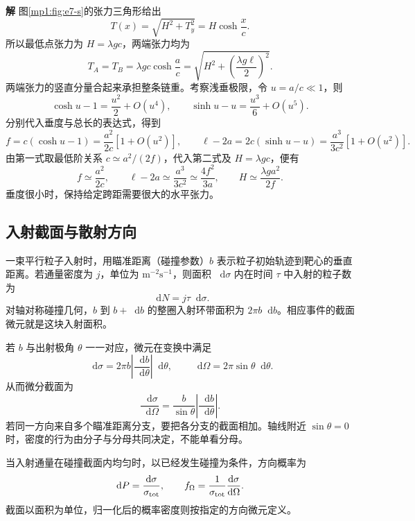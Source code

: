 \documentclass[11pt,openany,fontset=fandol]{ctexbook}
\theoremstyle{definition}\newtheorem{example}{例}[chapter]\newtheorem{exercise}{习题}[chapter]
\newcommand{\SolutionStart}{\par\medskip\ifdim\pagetotal>0pt\ifdim\dimexpr\pagegoal-\pagetotal\relax<3\baselineskip\newpage\fi\fi\noindent\textbf{解}\quad\ignorespaces}
\newenvironment{solution}{\SolutionStart}{\par\medskip}
\newcommand{\dd}{\mathop{}\!\mathrm d}\newcommand{\ee}{\mathrm e}\newcommand{\vct}[1]{\bm{#1}}
\begin{document}
\begin{solution}
图\ref{mp1:fig:e7-s}的张力三角形给出
\[
T(x)=\sqrt{H^2+T_y^2}=H\cosh\frac xc.
\]
所以最低点张力为 $H=\lambda gc$，两端张力均为
\[
T_A=T_B=\lambda gc\cosh\frac ac
=\sqrt{H^2+\left(\frac{\lambda g\ell}{2}\right)^2}.
\]
两端张力的竖直分量合起来承担整条链重。考察浅垂极限，令 $u=a/c\ll1$，则
\[
\cosh u-1=\frac{u^2}{2}+O(u^4),\qquad
\sinh u-u=\frac{u^3}{6}+O(u^5).
\]
分别代入垂度与总长的表达式，得到
\[
f=c(\cosh u-1)=\frac{a^2}{2c}[1+O(u^2)],\qquad
\ell-2a=2c(\sinh u-u)=\frac{a^3}{3c^2}[1+O(u^2)].
\]
由第一式取最低阶关系 $c\simeq a^2/(2f)$，代入第二式及 $H=\lambda gc$，便有
\[
f\simeq\frac{a^2}{2c},\qquad
\ell-2a\simeq\frac{a^3}{3c^2}\simeq\frac{4f^2}{3a},\qquad
H\simeq\frac{\lambda ga^2}{2f}.
\]
垂度很小时，保持给定跨距需要很大的水平张力。
\end{solution}

\subsection{入射截面与散射方向}
一束平行粒子入射时，用瞄准距离（碰撞参数）$b$ 表示粒子初始轨迹到靶心的垂直距离。若通量密度为 $j$，单位为 $\mathrm{m^{-2}s^{-1}}$，则面积 $\dd\sigma$ 内在时间 $\tau$ 中入射的粒子数为
\[
\dd N=j\tau\dd\sigma.
\]
对轴对称碰撞几何，$b$ 到 $b+\dd b$ 的整圈入射环带面积为 $2\pi b\dd b$。相应事件的截面微元就是这块入射面积。

若 $b$ 与出射极角 $\theta$ 一一对应，微元在变换中满足
\[
\dd\sigma=2\pi b\left|\frac{\dd b}{\dd\theta}\right|\dd\theta,
\qquad \dd\Omega=2\pi\sin\theta\dd\theta.
\]
从而微分截面为
\begin{equation}\label{mp1:eq:differential-cross-section}
\frac{\dd\sigma}{\dd\Omega}
=\frac b{\sin\theta}\left|\frac{\dd b}{\dd\theta}\right|.
\end{equation}
若同一方向来自多个瞄准距离分支，要把各分支的截面相加。轴线附近 $\sin\theta=0$ 时，密度的行为由分子与分母共同决定，不能单看分母。

当入射通量在碰撞截面内均匀时，以已经发生碰撞为条件，方向概率为
\[
\dd P=\frac{\dd\sigma}{\sigma_{\rm tot}},\qquad
f_\Omega=\frac1{\sigma_{\rm tot}}\frac{\dd\sigma}{\dd\Omega}.
\]
截面以面积为单位，归一化后的概率密度则按指定的方向微元定义。
\end{document}
